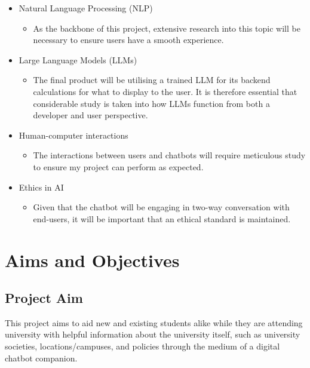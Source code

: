 \documentclass[12pt]{report}
\begin{document}
    \begin{itemize}
        \item Natural Language Processing (NLP) 
            \begin{itemize}
                \item As the backbone of this project, extensive research into this topic will be necessary 
                to ensure users have a smooth experience.
            \end{itemize}
        \item Large Language Models (LLMs)
            \begin{itemize}
                \item The final product will be utilising a trained LLM for its backend calculations
                for what to display to the user. It is therefore essential that considerable study 
                is taken into how LLMs function from both a developer and user perspective.
            \end{itemize}
        \item Human-computer interactions
            \begin{itemize}
                \item The interactions between users and chatbots will require meticulous study to ensure
                my project can perform as expected.
            \end{itemize}
        \item Ethics in AI
        \begin{itemize}
            \item Given that the chatbot will be engaging in two-way conversation with end-users, it will
            be important that an ethical standard is maintained.
        \end{itemize}
    \end{itemize}

    \chapter{Aims and Objectives}
    \section{Project Aim}
    This project aims to aid new and existing students alike while they are attending university with 
    helpful information about the university itself, such as university societies, locations/campuses, 
    and policies through the medium of a digital chatbot companion.
\end{document}
